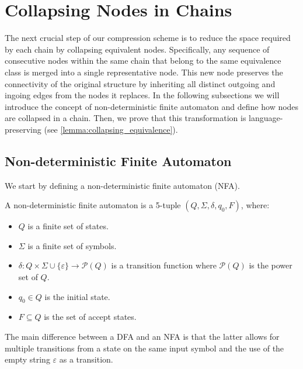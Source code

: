 \section{Collapsing Nodes in Chains} \label{sec:collapsing}
The next crucial step of our compression scheme is to reduce the space required by each chain by collapsing equivalent nodes. Specifically, any sequence of consecutive nodes within the same chain that belong to the same equivalence class is merged into a single representative node. This new node preserves the connectivity of the original structure by inheriting all distinct outgoing and ingoing edges from the nodes it replaces. In the following subsections we will introduce the concept of non-deterministic finite automaton and define how nodes are collapsed in a chain. Then, we prove that this transformation is language-preserving (see \cref{lemma:collapsing_equivalence}).

\subsection{Non-deterministic Finite Automaton}
We start by defining a non-deterministic finite automaton (NFA).  
\begin{definition}
    A non-deterministic finite automaton is a 5-tuple $(Q, \Sigma, \delta, q_0, F)$, where:
    \begin{itemize}[leftmargin=25pt]
        \item $Q$ is a finite set of states.
        \item $\Sigma$ is a finite set of symbols.
        \item $\delta: Q \times \Sigma \cup \{\varepsilon\} \to \mathcal{P}(Q)$ is a transition function where $\mathcal{P}(Q)$ is the power set of $Q$.
        \item $q_0 \in Q$ is the initial state.
        \item $F \subseteq Q$ is the set of accept states.
    \end{itemize}
\end{definition}
The main difference between a DFA and an NFA is that the latter allows for multiple transitions from a state on the same input symbol and the use of the empty string $\varepsilon$ as a transition.

